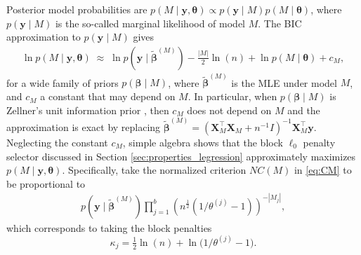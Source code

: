 \documentclass[bj,authoryear]{imsart}
\theoremstyle{plain}
\newcommand{\bs}{\boldsymbol}
\begin{document}
Posterior model probabilities are $p(M \mid \bs y, \bs \theta) \propto p(\bs y \mid M) p(M \mid \bs \theta)$, where $p(\bs y \mid M)$ is the so-called marginal likelihood of model $M$. The BIC approximation \citep{BIC} to $p( \bs y  \mid M)$ gives
\begin{eqnarray*}
\ln p(M \mid\bs y, \bs \theta) \;\approx\; \ln p(\bs y \mid \tilde{\bs \beta}^{(M)}) - \frac{|M|}{2}\ln(n) + \ln p(M\mid\bs \theta) + c_M,
\end{eqnarray*}
for a wide family of priors $p(\bs \beta \mid M)$, where $\tilde{\bs \beta}^{(M)}$ is the MLE under model $M$, and $c_M$ a constant that may depend on $M$.
In particular, when $p(\bs \beta \mid M)$ is Zellner's unit information prior \citep{zellner1986assessing}, then $c_M$ does not depend on $M$ and the approximation is exact by replacing $\tilde{\bs \beta}^{(M)}= (\bs X_M^\top \bs X_M + n^{-1} I)^{-1} \bs X_M^\top \bs y$.
Neglecting the constant $c_M$, simple algebra shows that 
the block $\ell_0$ penalty selector discussed in Section \ref{sec:properties_legression} approximately maximizes $p(M \mid \bs y, \bs \theta)$. %
Specifically, take the normalized criterion $NC(M)$ in \eqref{eq:CM} to be proportional to
\begin{align}
p(\bs y \mid \tilde{\bs \beta}^{(M)})  
\prod_{j=1}^b \left( n^{\frac{1}{2}}(1/\theta^{(j)} - 1) \right)^{-|M_j|},
    \nonumber
\end{align}
which corresponds to taking the block penalties  
\begin{equation}\label{eq:blockpenpriorinclu}
    \kappa_j=\tfrac{1}{2}\ln(n)+\ln\big(1/{\theta^{(j)}} - 1\big).
\end{equation}
\end{document}
